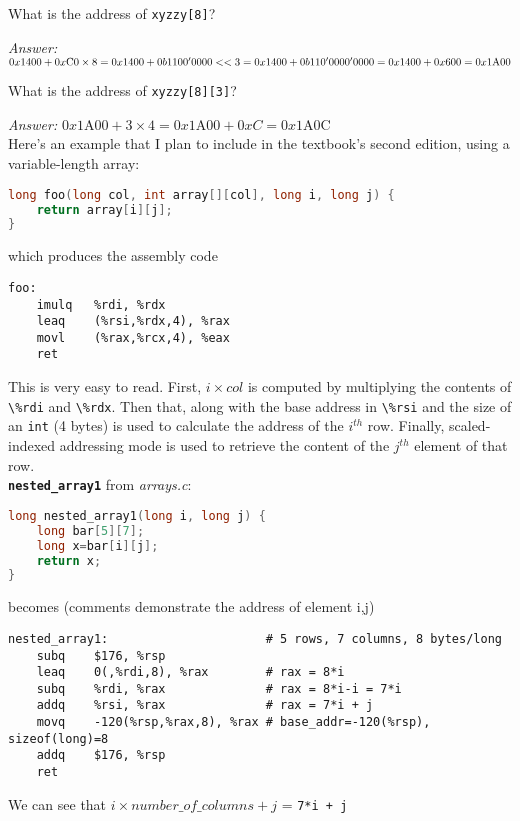 \documentclass{article}
\newcommand{\function}[1]{\textbf{\lstinline{#1}}}
\begin{document}
What is the address of \lstinline{xyzzy[8]}?

\textit{Answer:} $0x1400 + 0x\textrm{C}0 \times 8 = 0x1400 + 0b1100'0000 << 3 = \\ 0x1400 + 0b110'0000'0000 = 0x1400 + 0x600 = 0x1\mathrm{A}00$

What is the address of \lstinline{xyzzy[8][3]}?

\textit{Answer:} $0x1\mathrm{A}00 + 3 \times 4 = 0x1\mathrm{A}00 + 0xC = 0x1\mathrm{A}0\textrm{C}$ \\

Here's an example that I plan to include in the textbook's second edition, using a variable-length array:
\begin{lstlisting}[language=C]
long foo(long col, int array[][col], long i, long j) {
    return array[i][j];
}
\end{lstlisting}

which produces the assembly code
\begin{lstlisting}[language={[x86masm]Assembler}]
foo:
    imulq   %rdi, %rdx
    leaq    (%rsi,%rdx,4), %rax
    movl    (%rax,%rcx,4), %eax
    ret
\end{lstlisting}

This is very easy to read.
First, $i \times col$ is computed by multiplying the contents of \lstinline{\%rdi} and \lstinline{\%rdx}.
Then that, along with the base address in \lstinline{\%rsi} and the size of an \lstinline{int} (4 bytes) is used to calculate the address of the $i^{th}$ row.
Finally, scaled-indexed addressing mode is used to retrieve the content of the $j^{th}$ element of that row. \\

\function{nested_array1} from \textit{arrays.c}:
\begin{lstlisting}[language=C]
long nested_array1(long i, long j) {
    long bar[5][7];
    long x=bar[i][j];
    return x;
}
\end{lstlisting}
becomes (comments demonstrate the address of element i,j)
\begin{lstlisting}[language={[x86masm]Assembler}]
nested_array1:                      # 5 rows, 7 columns, 8 bytes/long
    subq    $176, %rsp
    leaq    0(,%rdi,8), %rax        # rax = 8*i
    subq    %rdi, %rax              # rax = 8*i-i = 7*i
    addq    %rsi, %rax              # rax = 7*i + j
    movq    -120(%rsp,%rax,8), %rax # base_addr=-120(%rsp), sizeof(long)=8
    addq    $176, %rsp
    ret
\end{lstlisting}
We can see that $i \times number\_of\_columns + j$ = \lstinline{7*i + j}
\end{document}

